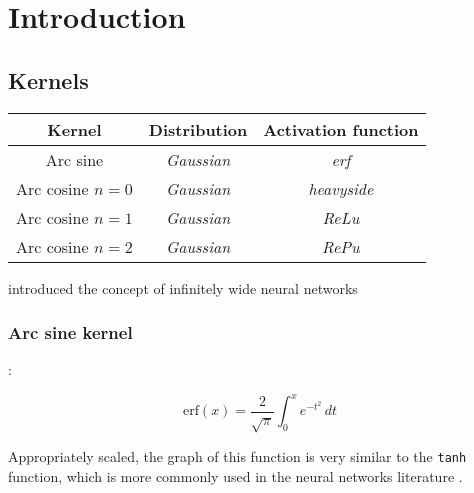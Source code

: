 \section{Introduction}%
\label{sec:introduction}

\subsection{Kernels}
\label{sub:kernels}

\begin{table}[H]
    \begin{tabular}{ccc}
        \toprule
        \textbf{Kernel} & \textbf{Distribution} & \textbf{Activation function} \\
        \midrule
        Arc sine & \textit{Gaussian} & \textit{erf} \\
        Arc cosine $n=0$ & \textit{Gaussian} & \textit{heavyside} \\
        Arc cosine $n=1$ & \textit{Gaussian} & \textit{ReLu} \\
        Arc cosine $n=2$ & \textit{Gaussian} & \textit{RePu} \\
        \bottomrule
    \end{tabular}
\end{table}

\Textcite{williamsComputationInfiniteNeural1998} introduced the concept of
infinitely wide neural networks 

\textcite{nealBayesianLearningNeural1996}

\subsubsection{Arc sine kernel}

\textcite{frenayParameterinsensitiveKernelExtreme2011,williamsComputationInfiniteNeural1998}:

\begin{equation}\label{eq:erf}
    \text{erf}(x) = \frac{2}{\sqrt{\pi}} \int_0^x e^{-t^2} \,dt
\end{equation}


Appropriately scaled, the graph of this function is very similar to the \texttt{tanh} function,
which is more commonly used in the neural networks literature
\cite{williamsComputationInfiniteNeural1998}.

